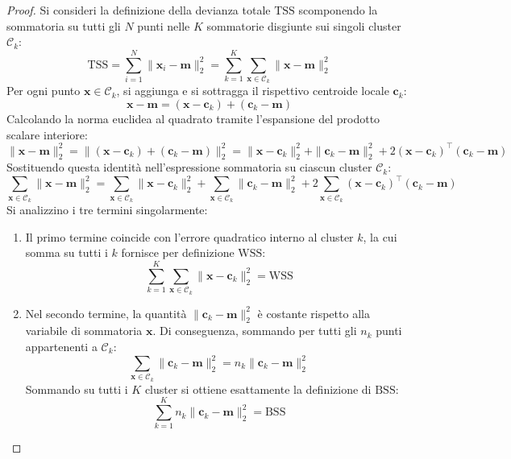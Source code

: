 \begin{proof}
Si consideri la definizione della devianza totale $\mathrm{TSS}$ scomponendo la sommatoria su tutti gli $N$ punti nelle $K$ sommatorie disgiunte sui singoli cluster $\mathcal{C}_k$:
\begin{equation}
\mathrm{TSS} = \sum_{i=1}^N \|\mathbf{x}_i - \mathbf{m}\|_2^2 = \sum_{k=1}^K \sum_{\mathbf{x} \in \mathcal{C}_k} \|\mathbf{x} - \mathbf{m}\|_2^2
\end{equation}
Per ogni punto $\mathbf{x} \in \mathcal{C}_k$, si aggiunga e si sottragga il rispettivo centroide locale $\mathbf{c}_k$:
\begin{equation}
\mathbf{x} - \mathbf{m} = (\mathbf{x} - \mathbf{c}_k) + (\mathbf{c}_k - \mathbf{m})
\end{equation}
Calcolando la norma euclidea al quadrato tramite l'espansione del prodotto scalare interiore:
\begin{equation}
\|\mathbf{x} - \mathbf{m}\|_2^2 = \|(\mathbf{x} - \mathbf{c}_k) + (\mathbf{c}_k - \mathbf{m})\|_2^2 = \|\mathbf{x} - \mathbf{c}_k\|_2^2 + \|\mathbf{c}_k - \mathbf{m}\|_2^2 + 2 (\mathbf{x} - \mathbf{c}_k)^\top (\mathbf{c}_k - \mathbf{m})
\end{equation}
Sostituendo questa identità nell'espressione sommatoria su ciascun cluster $\mathcal{C}_k$:
\begin{equation}
\sum_{\mathbf{x} \in \mathcal{C}_k} \|\mathbf{x} - \mathbf{m}\|_2^2 = \sum_{\mathbf{x} \in \mathcal{C}_k} \|\mathbf{x} - \mathbf{c}_k\|_2^2 + \sum_{\mathbf{x} \in \mathcal{C}_k} \|\mathbf{c}_k - \mathbf{m}\|_2^2 + 2 \sum_{\mathbf{x} \in \mathcal{C}_k} (\mathbf{x} - \mathbf{c}_k)^\top (\mathbf{c}_k - \mathbf{m})
\end{equation}
Si analizzino i tre termini singolarmente:
\begin{enumerate}
    \item Il primo termine coincide con l'errore quadratico interno al cluster $k$, la cui somma su tutti i $k$ fornisce per definizione $\mathrm{WSS}$:
    \begin{equation}
    \sum_{k=1}^K \sum_{\mathbf{x} \in \mathcal{C}_k} \|\mathbf{x} - \mathbf{c}_k\|_2^2 = \mathrm{WSS}
    \end{equation}
    
    \item Nel secondo termine, la quantità $\|\mathbf{c}_k - \mathbf{m}\|_2^2$ è costante rispetto alla variabile di sommatoria $\mathbf{x}$. Di conseguenza, sommando per tutti gli $n_k$ punti appartenenti a $\mathcal{C}_k$:
    \begin{equation}
    \sum_{\mathbf{x} \in \mathcal{C}_k} \|\mathbf{c}_k - \mathbf{m}\|_2^2 = n_k \|\mathbf{c}_k - \mathbf{m}\|_2^2
    \end{equation}
    Sommando su tutti i $K$ cluster si ottiene esattamente la definizione di $\mathrm{BSS}$:
    \begin{equation}
    \sum_{k=1}^K n_k \|\mathbf{c}_k - \mathbf{m}\|_2^2 = \mathrm{BSS}
    \end{equation}
    

\end{enumerate}
\end{proof}
